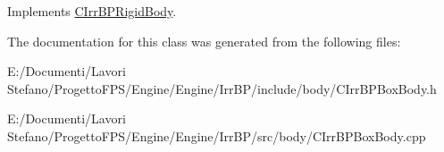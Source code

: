 Implements \hyperlink{class_c_irr_b_p_rigid_body_a961d442e36e78260e7a6f203fd0c11e9}{CIrrBPRigidBody}.



The documentation for this class was generated from the following files:\begin{DoxyCompactItemize}
\item 
E:/Documenti/Lavori Stefano/ProgettoFPS/Engine/Engine/IrrBP/include/body/CIrrBPBoxBody.h\item 
E:/Documenti/Lavori Stefano/ProgettoFPS/Engine/Engine/IrrBP/src/body/CIrrBPBoxBody.cpp\end{DoxyCompactItemize}
